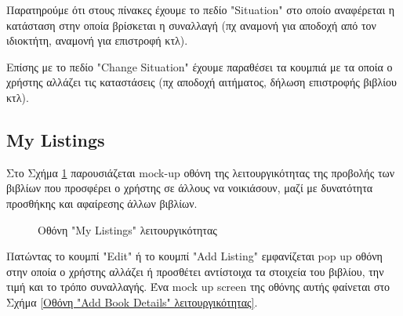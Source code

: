 \documentclass[12pt,a4paper]{article}
\begin{document}
Παρατηρούμε ότι στους πίνακες έχουμε το πεδίο "Situation" στο οποίο αναφέρεται η κατάσταση στην οποία βρίσκεται η συναλλαγή (πχ αναμονή για αποδοχή από τον ιδιοκτήτη, αναμονή για επιστροφή κτλ).

Επίσης με το πεδίο "Change Situation" έχουμε παραθέσει τα κουμπιά με τα οποία ο χρήστης αλλάζει τις καταστάσεις (πχ αποδοχή αιτήματος, δήλωση επιστροφής βιβλίου κτλ).

\subsection{My Listings}

Στο Σχήμα \ref{Οθόνη "My Listings" λειτουργικότητας} παρουσιάζεται mock-up οθόνη της λειτουργικότητας της προβολής των βιβλίων που προσφέρει ο χρήστης σε άλλους να νοικιάσουν, μαζί με δυνατότητα προσθήκης και αφαίρεσης άλλων βιβλίων.

\begin{figure}[H]
	\caption{Οθόνη "My Listings" λειτουργικότητας}
	\label{Οθόνη "My Listings" λειτουργικότητας}
\end{figure}

Πατώντας το κουμπί "Edit" ή το κουμπί "Add Listing" εμφανίζεται pop up οθόνη στην οποία ο χρήστης αλλάζει ή προσθέτει αντίστοιχα τα στοιχεία του βιβλίου, την τιμή και το τρόπο συναλλαγής. Ένα mock up screen της οθόνης αυτής φαίνεται στο Σχήμα \ref{Οθόνη "Add Book Details" λειτουργικότητας}.
\end{document}
